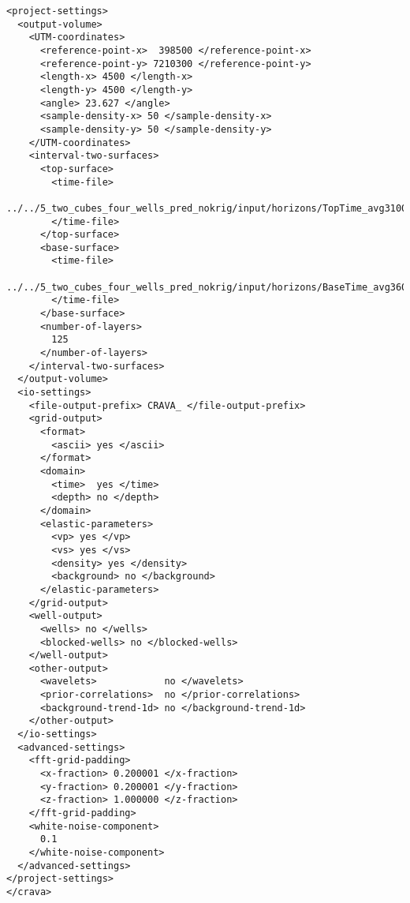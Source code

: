 \documentclass[screen,note,long,backref,indentpar]{nrdoc}
\begin{document}
\begin{small}
\begin{verbatim}
<project-settings>
  <output-volume>
    <UTM-coordinates>
      <reference-point-x>  398500 </reference-point-x>
      <reference-point-y> 7210300 </reference-point-y>
      <length-x> 4500 </length-x>
      <length-y> 4500 </length-y>
      <angle> 23.627 </angle>
      <sample-density-x> 50 </sample-density-x>
      <sample-density-y> 50 </sample-density-y>
    </UTM-coordinates>
    <interval-two-surfaces>
      <top-surface>
        <time-file>
          ../../5_two_cubes_four_wells_pred_nokrig/input/horizons/TopTime_avg3100ms.storm
        </time-file>
      </top-surface>
      <base-surface>
        <time-file>
          ../../5_two_cubes_four_wells_pred_nokrig/input/horizons/BaseTime_avg3600ms.storm
        </time-file>
      </base-surface>
      <number-of-layers>
        125
      </number-of-layers>
    </interval-two-surfaces>
  </output-volume>
  <io-settings>
    <file-output-prefix> CRAVA_ </file-output-prefix>
    <grid-output>
      <format>
        <ascii> yes </ascii>
      </format>
      <domain>
        <time>  yes </time>
        <depth> no </depth>
      </domain>
      <elastic-parameters>
        <vp> yes </vp>
        <vs> yes </vs>
        <density> yes </density>
        <background> no </background>
      </elastic-parameters>
    </grid-output>
    <well-output>
      <wells> no </wells>
      <blocked-wells> no </blocked-wells>
    </well-output>
    <other-output>
      <wavelets>            no </wavelets>
      <prior-correlations>  no </prior-correlations>
      <background-trend-1d> no </background-trend-1d>
    </other-output>
  </io-settings>
  <advanced-settings>
    <fft-grid-padding>
      <x-fraction> 0.200001 </x-fraction>
      <y-fraction> 0.200001 </y-fraction>
      <z-fraction> 1.000000 </z-fraction>
    </fft-grid-padding>
    <white-noise-component>
      0.1
    </white-noise-component>
  </advanced-settings>
</project-settings>
</crava>

\end{verbatim}
\end{small}



\end{document}
